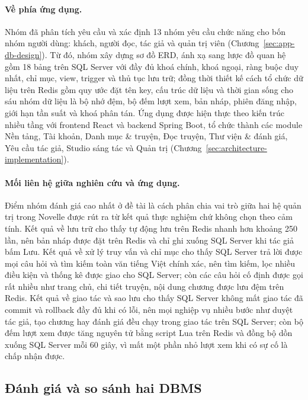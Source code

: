 \paragraph{Về phía ứng dụng.} Nhóm đã phân tích yêu cầu và xác định 13 nhóm yêu cầu chức năng cho bốn nhóm người dùng: khách, người đọc, tác giả và quản trị viên (Chương~\ref{sec:app-db-design}). Từ đó, nhóm xây dựng sơ đồ ERD, ánh xạ sang lược đồ quan hệ gồm 18 bảng trên SQL Server với đầy đủ khoá chính, khoá ngoại, ràng buộc duy nhất, chỉ mục, view, trigger và thủ tục lưu trữ; đồng thời thiết kế cách tổ chức dữ liệu trên Redis gồm quy ước đặt tên key, cấu trúc dữ liệu và thời gian sống cho sáu nhóm dữ liệu là bộ nhớ đệm, bộ đếm lượt xem, bản nháp, phiên đăng nhập, giới hạn tần suất và khoá phân tán. Ứng dụng được hiện thực theo kiến trúc nhiều tầng với frontend React và backend Spring Boot, tổ chức thành các module Nền tảng, Tài khoản, Danh mục \& truyện, Đọc truyện, Thư viện \& đánh giá, Yêu cầu tác giả, Studio sáng tác và Quản trị (Chương~\ref{sec:architecture-implementation}).

\paragraph{Mối liên hệ giữa nghiên cứu và ứng dụng.} Điểm nhóm đánh giá cao nhất ở đề tài là cách phân chia vai trò giữa hai hệ quản trị trong Novelle được rút ra từ kết quả thực nghiệm chứ không chọn theo cảm tính. Kết quả về lưu trữ cho thấy tự động lưu trên Redis nhanh hơn khoảng 250 lần, nên bản nháp được đặt trên Redis và chỉ ghi xuống SQL Server khi tác giả bấm Lưu. Kết quả về xử lý truy vấn và chỉ mục cho thấy SQL Server trả lời được mọi câu hỏi và tìm kiếm toàn văn tiếng Việt chính xác, nên tìm kiếm, lọc nhiều điều kiện và thống kê được giao cho SQL Server; còn các câu hỏi cố định được gọi rất nhiều như trang chủ, chi tiết truyện, nội dung chương được lưu đệm trên Redis. Kết quả về giao tác và sao lưu cho thấy SQL Server không mất giao tác đã commit và rollback đầy đủ khi có lỗi, nên mọi nghiệp vụ nhiều bước như duyệt tác giả, tạo chương hay đánh giá đều chạy trong giao tác trên SQL Server; còn bộ đếm lượt xem được tăng nguyên tử bằng script Lua trên Redis và đồng bộ dồn xuống SQL Server mỗi 60 giây, vì mất một phần nhỏ lượt xem khi có sự cố là chấp nhận được.

\subsection{Đánh giá và so sánh hai DBMS}
\label{subsec:conclusion-comparison}

